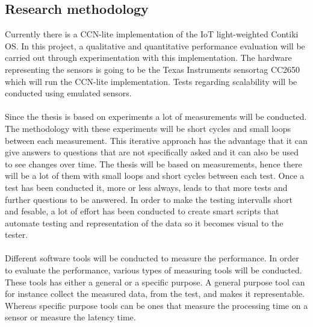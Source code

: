\subsection{Research methodology}
Currently there is a CCN-lite implementation of the IoT light-weighted Contiki OS. In this project, a qualitative and quantitative performance evaluation will be carried out through experimentation with this implementation. The hardware representing the sensors is going to be the Texas Instruments sensortag CC2650 which will run the CCN-lite implementation. Tests regarding scalability will be conducted using emulated sensors.\\\\ 
Since the thesis is based on experiments a lot of measurements will be conducted. The methodology with these experiments will be short cycles and small loops between each measurement. This iterative approach has the advantage that it can give answers to questions that are not specifically asked and it can also be used to see changes over time. The thesis will be based on measurements, hence there will be a lot of them with small loops and short cycles between each test. Once a test has been conducted it, more or less always, leads to that more tests and further questions to be answered. In order to make the testing intervalls short and fesable, a lot of effort has been conducted to create smart scripts that automate testing and representation of the data so it becomes visual to the tester. 
\\\\
Different software tools will be conducted to measure the performance. 
In order to evaluate the performance, various types of measuring tools will be conducted. These tools has either a general or a specific purpose. A general purpose tool can for instance collect the measured data, from the test, and makes it representable. Whereas specific purpose tools can be ones that measure the processing time on a sensor or measure the latency time. 

